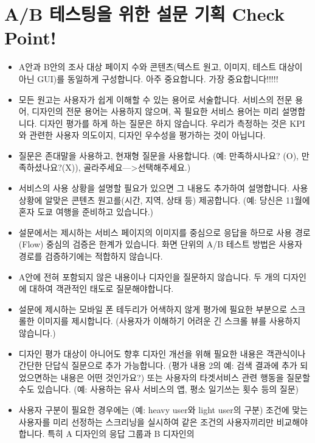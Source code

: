\documentclass[
  letterpaper,
]{book}
\providecommand{\tightlist}{%
  \setlength{\itemsep}{0pt}\setlength{\parskip}{0pt}}\usepackage{longtable,booktabs,array}
\begin{document}
\section{A/B 테스팅을 위한 설문 기획 Check
Point!}\label{ab-uxd14cuxc2a4uxd305uxc744-uxc704uxd55c-uxc124uxbb38-uxae30uxd68d-check-point}

\begin{itemize}
\tightlist
\item
  A안과 B안의 조사 대상 페이지 수와 콘텐츠(텍스트 원고, 이미지, 테스트
  대상이 아닌 GUI)를 동일하게 구성합니다. 아주 중요합니다. 가장
  중요합니다!!!!!
\item
  모든 원고는 사용자가 쉽게 이해할 수 있는 용어로 서술합니다. 서비스의
  전문 용어, 디자인의 전문 용어는 사용하지 않으며, 꼭 필요한 서비스
  용어는 미리 설명합니다. 디자인 평가를 하게 하는 질문은 하지 않습니다.
  우리가 측정하는 것은 KPI와 관련한 사용자 의도이지, 디자인 우수성을
  평가하는 것이 아닙니다.
\item
  질문은 존대말을 사용하고, 현재형 질문을 사용합니다. (예: 만족하시나요?
  (O), 만족하셨나요?(X)), 골라주세요---\textgreater 선택해주세요.)
\item
  서비스의 사용 상황을 설명할 필요가 있으면 그 내용도 추가하여
  설명합니다. 사용 상황에 알맞은 콘텐츠 원고를(시간, 지역, 상태 등)
  제공합니다. (예: 당신은 11월에 혼자 도쿄 여행을 준비하고 있습니다.)
\item
  설문에서는 제시하는 서비스 페이지의 이미지를 중심으로 응답을 하므로
  사용 경로(Flow) 중심의 검증은 한계가 있습니다. 화면 단위의 A/B 테스트
  방법은 사용자 경로를 검증하기에는 적합하지 않습니다.
\item
  A안에 전혀 포함되지 않은 내용이나 디자인을 질문하지 않습니다. 두 개의
  디자인에 대하여 객관적인 태도로 질문해야합니다.
\item
  설문에 제시하는 모바일 폰 테두리가 어색하지 않게 평가에 필요한
  부분으로 스크롤한 이미지를 제시합니다. (사용자가 이해하기 어려운 긴
  스크롤 뷰를 사용하지 않습니다.)
\item
  디자인 평가 대상이 아니어도 향후 디자인 개선을 위해 필요한 내용은
  객관식이나 간단한 단답식 질문으로 추가 가능합니다. (평가 내용 2의 예:
  검색 결과에 추가 되었으면하는 내용은 어떤 것인가요?) 또는 사용자의
  타겟서비스 관련 행동을 질문할 수도 있습니다. (예: 사용하는 유사
  서비스의 앱, 평소 일기쓰는 횟수 등의 질문)
\item
  사용자 구분이 필요한 경우에는 (예: heavy user와 light user의 구분)
  조건에 맞는 사용자를 미리 선정하는 스크리닝을 실시하여 같은 조건의
  사용자끼리만 비교해야합니다. 특히 A 디자인의 응답 그룹과 B 디자인의

\end{itemize}
\end{document}
